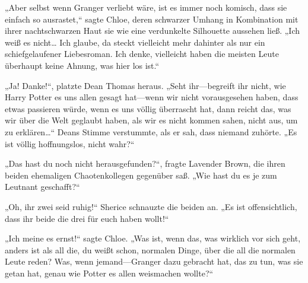 „Aber selbst wenn Granger verliebt wäre, ist es immer noch komisch, dass sie einfach so ausrastet,“ sagte Chloe, deren schwarzer Umhang in Kombination mit ihrer nachtschwarzen Haut sie wie eine verdunkelte Silhouette aussehen ließ. „Ich weiß es nicht… Ich glaube, da steckt vielleicht mehr dahinter als nur ein schiefgelaufener Liebesroman. Ich denke, vielleicht haben die meisten Leute überhaupt keine Ahnung, was hier los ist.“

„Ja! Danke!“, platzte Dean Thomas heraus. „Seht ihr—begreift ihr nicht, wie Harry Potter es uns allen gesagt hat—wenn wir nicht vorausgesehen haben, dass etwas passieren würde, wenn es uns völlig überrascht hat, dann reicht das, was wir über die Welt geglaubt haben, als wir es nicht kommen sahen, nicht aus, um zu erklären…“ Deans Stimme verstummte, als er sah, dass niemand zuhörte. „Es ist völlig hoffnungslos, nicht wahr?“

„Das hast du noch nicht herausgefunden?“, fragte Lavender Brown, die ihren beiden ehemaligen Chaotenkollegen gegenüber saß. „Wie hast du es je zum Leutnant geschafft?“

„Oh, ihr zwei seid ruhig!“ Sherice schnauzte die beiden an. „Es ist offensichtlich, dass ihr beide die drei für euch haben wollt!“

„Ich meine es ernst!“ sagte Chloe. „Was ist, wenn das, was wirklich vor sich geht, anders ist als all die, du weißt schon, normalen Dinge, über die all die normalen Leute reden? Was, wenn jemand—Granger dazu gebracht hat, das zu tun, was sie getan hat, genau wie Potter es allen weismachen wollte?“

